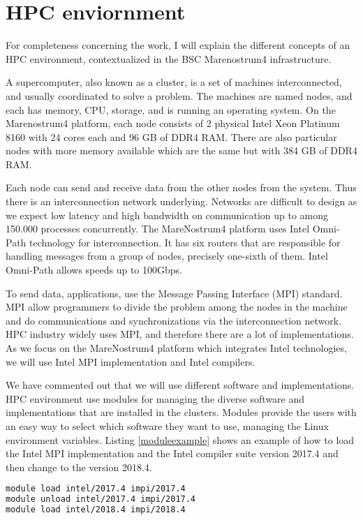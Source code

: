 \section{HPC enviornment}

For completeness concerning the work, I will explain the different concepts of an HPC environment, contextualized in the BSC Marenostrum4 infrastructure\cite{mn4userguide}.

A supercomputer, also known as a cluster, is a set of machines interconnected, and usually coordinated to solve a problem. The machines are named nodes, and each has memory, CPU, storage, and is running an operating system.  On the Marenostrum4 platform, each node consists of 2 physical Intel Xeon Platinum 8160 with 24 cores each and 96 GB of DDR4 RAM. There are also particular nodes with more memory available which are the same but with 384 GB of DDR4 RAM.
 
Each node can send and receive data from the other nodes from the system. Thus there is an interconnection network underlying. Networks are difficult to design as we expect low latency and high bandwidth on communication up to among 150.000 processes concurrently. The MareNostrum4 platform uses Intel Omni-Path technology for interconnection. It has six routers that are responsible for handling messages from a group of nodes, precisely one-sixth of them. Intel Omni-Path allows speeds up to 100Gbps.

To send data, applications, use the Message Passing Interface (MPI) standard. MPI allow programmers to divide the problem among the nodes in the machine and do communications and synchronizations via the interconnection network. HPC industry widely uses MPI, and therefore there are a lot of implementations. As we focus on the MareNostrum4 platform which integrates Intel technologies, we will use Intel MPI implementation and Intel compilers.

We have commented out that we will use different software and implementations.  HPC environment use modules for managing the diverse software and implementations that are installed in the clusters. Modules provide the users with an easy way to select which software they want to use, managing the Linux environment variables. Listing \ref{moduleexample} shows an example of how to load the Intel MPI implementation and the Intel compiler suite version 2017.4 and then change to the version 2018.4.

\begin{lstlisting}[language=sh, caption={Example of module usage.}, label={moduleexample}]
module load intel/2017.4 impi/2017.4
module unload intel/2017.4 impi/2017.4
module load intel/2018.4 impi/2018.4
\end{lstlisting}


